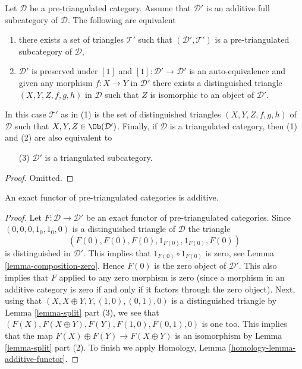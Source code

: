 \begin{lemma}
\label{lemma-triangulated-subcategory}
Let $\mathcal{D}$ be a pre-triangulated category.
Assume that $\mathcal{D}'$ is an additive full subcategory of $\mathcal{D}$.
The following are equivalent
\begin{enumerate}
\item there exists a set of triangles $\mathcal{T}'$ such that
$(\mathcal{D}', \mathcal{T}')$ is a pre-triangulated subcategory
of $\mathcal{D}$,
\item $\mathcal{D}'$ is preserved under $[1]$ and
$[1] : \mathcal{D}' \to \mathcal{D}'$ is an auto-equivalence and
given any morphism $f : X \to Y$ in $\mathcal{D}'$ there exists
a distinguished triangle $(X, Y, Z, f, g, h)$ in $\mathcal{D}$
such that $Z$ is isomorphic to an object of $\mathcal{D}'$.
\end{enumerate}
In this case $\mathcal{T}'$ as in (1) is the set of distinguished triangles
$(X, Y, Z, f, g, h)$ of $\mathcal{D}$ such that
$X, Y, Z \in \Ob(\mathcal{D}')$. Finally, if $\mathcal{D}$
is a triangulated category, then (1) and (2) are also equivalent to
\begin{enumerate}
\item[(3)] $\mathcal{D}'$ is a triangulated subcategory.
\end{enumerate}
\end{lemma}

\begin{proof}
Omitted.
\end{proof}

\begin{lemma}
\label{lemma-exact-functor-additive}
An exact functor of pre-triangulated categories is additive.
\end{lemma}

\begin{proof}
Let $F : \mathcal{D} \to \mathcal{D}'$ be an exact functor of
pre-triangulated categories. Since
$(0, 0, 0, 1_0, 1_0, 0)$ is a distinguished triangle of $\mathcal{D}$
the triangle
$$
(F(0), F(0), F(0), 1_{F(0)}, 1_{F(0)}, F(0))
$$
is distinguished in $\mathcal{D}'$.
This implies that $1_{F(0)} \circ 1_{F(0)}$ is zero, see
Lemma \ref{lemma-composition-zero}.
Hence $F(0)$ is the zero object of $\mathcal{D}'$. This also implies
that $F$ applied to any zero morphism is zero (since a morphism in
an additive category is zero if and only if it factors through the
zero object). Next, using that
$(X, X \oplus Y, Y, (1, 0), (0, 1), 0)$ is a distinguished triangle by
Lemma \ref{lemma-split} part (3), we see that
$(F(X), F(X \oplus Y), F(Y), F(1, 0), F(0, 1), 0)$ is
one too. This implies that the map $F(X) \oplus F(Y) \to F(X \oplus Y)$
is an isomorphism by Lemma \ref{lemma-split} part (2). To finish we apply
Homology, Lemma \ref{homology-lemma-additive-functor}.
\end{proof}

